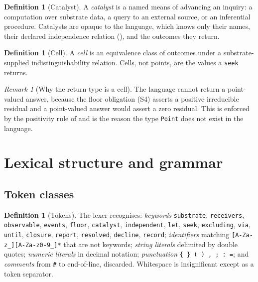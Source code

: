 \documentclass[11pt,a4paper]{article}
\theoremstyle{thmstyle}
\theoremstyle{definition}
\newtheorem{definition}[theorem]{Definition}
\theoremstyle{remark}
\newtheorem{remark}[theorem]{Remark}
\begin{document}
\begin{definition}[Catalyst]
\label{def:catalyst}
A \emph{catalyst} is a named means of advancing an inquiry: a computation
over substrate data, a query to an external source, or an inferential
procedure. Catalysts are opaque to the language, which knows only their
names, their declared independence relation
(), and the outcomes they return.
\end{definition}

\begin{definition}[Cell]
\label{def:cell}
A \emph{cell} is an equivalence class of outcomes under a substrate-supplied
indistinguishability relation. Cells, not points, are the values a
\texttt{seek} returns.
\end{definition}

\begin{remark}[Why the return type is a cell]
\label{rem:cell}
The language cannot return a point-valued answer, because the floor
obligation (S4) asserts a positive irreducible residual and a point-valued
answer would assert a zero residual. This is enforced by the positivity rule
of  and is the reason the type \texttt{Point} does not
exist in the language.
\end{remark}

\section{Lexical structure and grammar}
\label{sec:grammar}

\subsection{Token classes}

\begin{definition}[Tokens]
\label{def:tokens}
The lexer recognises: \emph{keywords}
\texttt{substrate}, \texttt{receivers}, \texttt{observable},
\texttt{events}, \texttt{floor}, \texttt{catalyst}, \texttt{independent},
\texttt{let}, \texttt{seek}, \texttt{excluding}, \texttt{via},
\texttt{until}, \texttt{closure}, \texttt{report}, \texttt{resolved},
\texttt{decline}, \texttt{record};
\emph{identifiers} matching \texttt{[A-Za-z\_][A-Za-z0-9\_]*} that are not
keywords; \emph{string literals} delimited by double quotes;
\emph{numeric literals} in decimal notation; \emph{punctuation}
\texttt{\{ \} ( ) , ; : =}; and \emph{comments} from \texttt{\#} to
end-of-line, discarded. Whitespace is insignificant except as a token
separator.
\end{definition}
\end{document}
